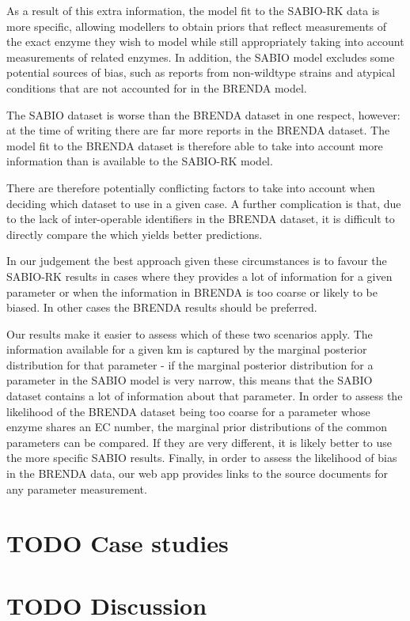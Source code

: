 \documentclass[11pt]{article}
\begin{document}
As a result of this extra information, the model fit to the SABIO-RK data is
more specific, allowing modellers to obtain priors that reflect measurements of
the exact enzyme they wish to model while still appropriately taking into
account measurements of related enzymes. In addition, the SABIO model excludes
some potential sources of bias, such as reports from non-wildtype strains and
atypical conditions that are not accounted for in the BRENDA model.

The SABIO dataset is worse than the BRENDA dataset in one respect, however: at
the time of writing there are far more reports in the BRENDA dataset. The model
fit to the BRENDA dataset is therefore able to take into account more
information than is available to the SABIO-RK model.

There are therefore potentially conflicting factors to take into account when
deciding which dataset to use in a given case. A further complication is that,
due to the lack of inter-operable identifiers in the BRENDA dataset, it is
difficult to directly compare the which yields better predictions.

In our judgement the best approach given these circumstances is to favour the
SABIO-RK results in cases where they provides a lot of information for a given
parameter or when the information in BRENDA is too coarse or likely to be
biased. In other cases the BRENDA results should be preferred.

Our results make it easier to assess which of these two scenarios apply. The
information available for a given km is captured by the marginal posterior
distribution for that parameter - if the marginal posterior distribution for a
parameter in the SABIO model is very narrow, this means that the SABIO dataset
contains a lot of information about that parameter. In order to assess the
likelihood of the BRENDA dataset being too coarse for a parameter whose enzyme
shares an EC number, the marginal prior distributions of the common parameters
can be compared. If they are very different, it is likely better to use the more
specific SABIO results. Finally, in order to assess the likelihood of bias in
the BRENDA data, our web app provides links to the source documents for any
parameter measurement.

\section{{\bfseries\sffamily TODO} Case studies}
\label{sec:org64cbb0a}
\section{{\bfseries\sffamily TODO} Discussion}
\label{sec:org1a5ed20}
\end{document}
